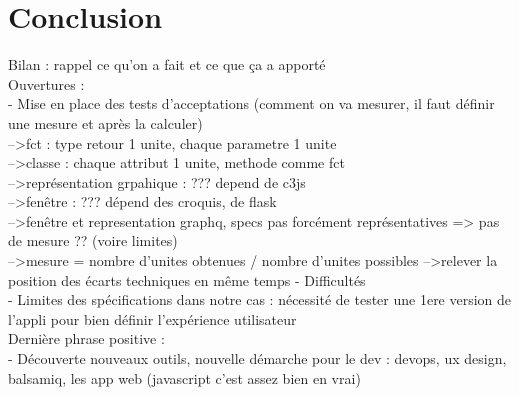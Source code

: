 	\section*{Conclusion}
		Bilan : rappel ce qu'on a fait et ce que ça a apporté\\
		Ouvertures :\\
			- Mise en place des tests d'acceptations (comment on va mesurer, il faut définir une mesure et après la calculer)\\
			-->fct : type retour 1 unite, chaque parametre 1 unite\\
			-->classe : chaque attribut 1 unite, methode comme fct\\
			-->représentation grpahique :  ??? depend de c3js\\
			-->fenêtre : ??? dépend des croquis, de flask\\
			-->fenêtre et representation graphq, specs pas forcément  représentatives => pas de mesure ??  (voire limites)\\
			-->mesure = nombre d'unites obtenues / nombre d'unites possibles
			-->relever la position des écarts techniques en même temps
			- Difficultés\\
			- Limites des spécifications dans notre cas : nécessité de tester une 1ere version de l'appli pour bien définir l'expérience utilisateur\\
		Dernière phrase positive :\\
			- Découverte nouveaux outils, nouvelle démarche pour le dev : devops, ux design, balsamiq, les app web (javascript c'est assez bien en vrai)
		

